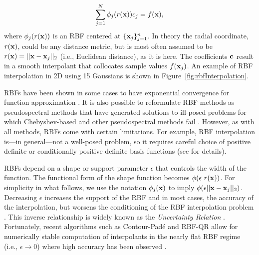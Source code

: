 \documentclass{report}
\begin{document}
{\begin{eqnarray*}
    \sum_{j=1}^{N} \phi_j(r(\mathbf{x})) c_{j}   = f(\mathbf{x}),
\end{eqnarray*}
where $\phi_j(r(\mathbf{x}))$ is an RBF centered at $\{\mathbf{x}_j\}_{j=1}^{n}$. In theory the radial coordinate, $r(\mathbf{x})$, could be any distance metric, but is most often assumed to be $r(\mathbf{x}) = ||\mathbf{x}-\mathbf{x}_j||_2$ (i.e., Euclidean distance), as it is here. The coefficients $\mathbf{c}$ result in a smooth interpolant that collocates sample values $f(\mathbf{x}_j)$. An example of RBF interpolation in 2D using 15 Gaussians is shown in Figure~\ref{fig:rbfInterpolation}. 



RBFs have been shown in 
some cases to have exponential convergence for function approximation \cite{Fasshauer2007}. It is also possible to 
reformulate RBF methods as pseudospectral methods that have 
generated solutions to ill-posed problems for which Chebyshev-based and other pseudospectral methods 
fail \cite{Fasshauer2006}. However, as with all methods, RBFs come with certain limitations. For example, RBF interpolation is---in general---not a well-posed problem, so it requires careful choice of positive definite or conditionally positive definite basis functions (see \cite{Iske2004, Fasshauer2007} for details). 

RBFs depend on a shape or support parameter $\epsilon$ that controls the width of the function. The functional form of the shape function becomes $\phi(\epsilon\  r(\mathbf{x}))$. For simplicity in what follows, we use the notation $\phi_j(\mathbf{x})$ to imply $\phi(\epsilon ||\mathbf{x}-\mathbf{x}_j||_2)$. Decreasing $\epsilon$ increases the support of the RBF and in most cases, the accuracy of the interpolation, but worsens the conditioning of the RBF interpolation problem \cite{Schaback1995}. This inverse relationship is widely known as the \emph{Uncertainty Relation} \cite{Schaback1995, Iske2004}. 
Fortunately, recent algorithms such as Contour-Pad\'{e} \cite{Fornberg2004} and RBF-QR \cite{Fornberg2007, Fornberg2011a} allow for numerically stable computation of interpolants in the nearly flat RBF regime (i.e., $\epsilon \rightarrow 0$) where high accuracy has been observed \cite{Larsson2003, Fornberg2008}. 










}
\end{document}
